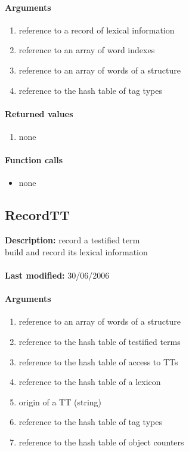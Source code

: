 \paragraph{Arguments}
\begin{enumerate}
\item reference to a record of lexical information
\item reference to an array of word indexes
\item reference to an array of words of a structure
\item reference to the hash table of tag types
\end{enumerate}

\paragraph{Returned values}
\begin{enumerate}
\item none
\end{enumerate}

\paragraph{Function calls}
\begin{itemize}
\item none
\end{itemize}

\subsection{RecordTT}
\textbf{Description:} record a testified term\\
build and record its lexical information\\
\\\textbf{Last modified:} 30/06/2006

\paragraph{Arguments}
\begin{enumerate}
\item reference to an array of words of a structure
\item reference to the hash table of testified terms
\item reference to the hash table of access to TTs
\item reference to the hash table of a lexicon
\item origin of a TT (string)
\item reference to the hash table of tag types
\item reference to the hash table of object counters
\end{enumerate}

